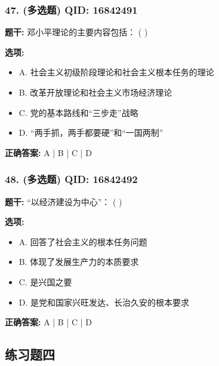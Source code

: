 \documentclass[12pt,UTF8]{ctexart}
\begin{document}
\subsubsection*{47. (多选题) \small QID: 16842491}

\textbf{题干:}
邓小平理论的主要内容包括： ( )

\textbf{选项:}
\begin{itemize}[leftmargin=*]

  \item A. 社会主义初级阶段理论和社会主义根本任务的理论

  \item B. 改革开放理论和社会主义市场经济理论

  \item C. 党的基本路线和“三步走”战略

  \item D. “两手抓，两手都要硬”和“一国两制”

\end{itemize}

\textbf{正确答案:}
A | B | C | D

\vspace{0.3em}\hrulefill\vspace{0.7em}

\subsubsection*{48. (多选题) \small QID: 16842492}

\textbf{题干:}
“以经济建设为中心”： ( )

\textbf{选项:}
\begin{itemize}[leftmargin=*]

  \item A. 回答了社会主义的根本任务问题

  \item B. 体现了发展生产力的本质要求

  \item C. 是兴国之要

  \item D. 是党和国家兴旺发达、长治久安的根本要求

\end{itemize}

\textbf{正确答案:}
A | B | C | D

\vspace{0.3em}\hrulefill\vspace{0.7em}

\subsection*{练习题四}
\end{document}
